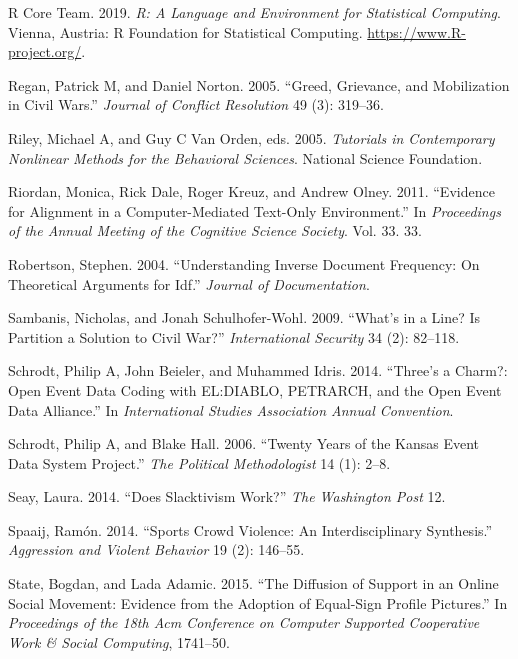 \documentclass[english,man]{apa6}
\begin{document}
\leavevmode\hypertarget{ref-R-base}{}%
R Core Team. 2019. \emph{R: A Language and Environment for Statistical Computing}. Vienna, Austria: R Foundation for Statistical Computing. \url{https://www.R-project.org/}.

\leavevmode\hypertarget{ref-regan2005greed}{}%
Regan, Patrick M, and Daniel Norton. 2005. ``Greed, Grievance, and Mobilization in Civil Wars.'' \emph{Journal of Conflict Resolution} 49 (3): 319--36.

\leavevmode\hypertarget{ref-riley2005tutorials}{}%
Riley, Michael A, and Guy C Van Orden, eds. 2005. \emph{Tutorials in Contemporary Nonlinear Methods for the Behavioral Sciences}. National Science Foundation.

\leavevmode\hypertarget{ref-riordan2011evidence}{}%
Riordan, Monica, Rick Dale, Roger Kreuz, and Andrew Olney. 2011. ``Evidence for Alignment in a Computer-Mediated Text-Only Environment.'' In \emph{Proceedings of the Annual Meeting of the Cognitive Science Society}. Vol. 33. 33.

\leavevmode\hypertarget{ref-robertson2004understanding}{}%
Robertson, Stephen. 2004. ``Understanding Inverse Document Frequency: On Theoretical Arguments for Idf.'' \emph{Journal of Documentation}.

\leavevmode\hypertarget{ref-sambanis2009s}{}%
Sambanis, Nicholas, and Jonah Schulhofer-Wohl. 2009. ``What's in a Line? Is Partition a Solution to Civil War?'' \emph{International Security} 34 (2): 82--118.

\leavevmode\hypertarget{ref-schrodt2014three}{}%
Schrodt, Philip A, John Beieler, and Muhammed Idris. 2014. ``Three's a Charm?: Open Event Data Coding with EL:DIABLO, PETRARCH, and the Open Event Data Alliance.'' In \emph{International Studies Association Annual Convention}.

\leavevmode\hypertarget{ref-schrodt2006twenty}{}%
Schrodt, Philip A, and Blake Hall. 2006. ``Twenty Years of the Kansas Event Data System Project.'' \emph{The Political Methodologist} 14 (1): 2--8.

\leavevmode\hypertarget{ref-seay2014slacktivism}{}%
Seay, Laura. 2014. ``Does Slacktivism Work?'' \emph{The Washington Post} 12.

\leavevmode\hypertarget{ref-spaaij2014sports}{}%
Spaaij, Ramón. 2014. ``Sports Crowd Violence: An Interdisciplinary Synthesis.'' \emph{Aggression and Violent Behavior} 19 (2): 146--55.

\leavevmode\hypertarget{ref-state2015diffusion}{}%
State, Bogdan, and Lada Adamic. 2015. ``The Diffusion of Support in an Online Social Movement: Evidence from the Adoption of Equal-Sign Profile Pictures.'' In \emph{Proceedings of the 18th Acm Conference on Computer Supported Cooperative Work \& Social Computing}, 1741--50.
\end{document}
